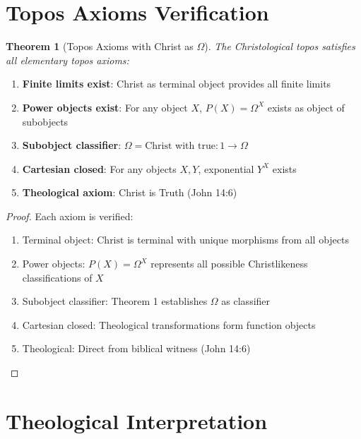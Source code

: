 \documentclass{article}
\newtheorem{theorem}{Theorem}
\begin{document}
\section{Topos Axioms Verification}

\begin{theorem}[Topos Axioms with Christ as $\Omega$]
The Christological topos satisfies all elementary topos axioms:
\end{theorem}

\begin{enumerate}
    \item \textbf{Finite limits exist}: Christ as terminal object provides all finite limits

    \item \textbf{Power objects exist}: For any object $X$, $P(X) = \Omega^X$ exists as object of subobjects

    \item \textbf{Subobject classifier}: $\Omega = \text{Christ}$ with $\text{true}: 1 \to \Omega$

    \item \textbf{Cartesian closed}: For any objects $X, Y$, exponential $Y^X$ exists

    \item \textbf{Theological axiom}: Christ is Truth (John 14:6)
\end{enumerate}

\begin{proof}
Each axiom is verified:
\begin{enumerate}
    \item Terminal object: $\text{Christ}$ is terminal with unique morphisms from all objects

    \item Power objects: $P(X) = \Omega^X$ represents all possible Christlikeness classifications of $X$

    \item Subobject classifier: Theorem 1 establishes $\Omega$ as classifier

    \item Cartesian closed: Theological transformations form function objects

    \item Theological: Direct from biblical witness (John 14:6)
\end{enumerate}
\end{proof}

\section{Theological Interpretation}
\end{document}
